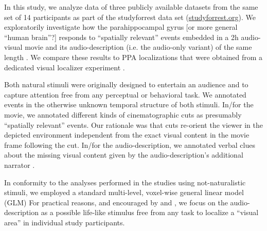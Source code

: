 \documentclass[english]{article}
\begin{document}

In this study, we analyze data of three publicly available datasets from the same set of 14 participants as part of the studyforrest data set (\href{http://www.studyforrest.org}{studyforrest.org}).
We exploratorily investigate how the parahippocampal gyrus [or more general ``human brain''?] responds to ``spatially relevant'' events embedded in a 2h audio-visual movie \citep{hanke2016simultaneous} and its audio-description (i.e. the audio-only variant) of the same length \citep{hanke2014audiomovie}.
We compare these results to PPA localizations that were obtained from a dedicated visual localizer experiment \citep{sengupta2016extension}.

Both natural stimuli were originally designed to entertain an audience and to capture attention free from any perceptual or behavioral task.
We annotated events in the otherwise unknown temporal structure of both stimuli.
In/for the movie, we annotated different kinds of cinematographic cuts \citep{haeusler2016cutanno} as presumably ``spatially relevant'' events.
Our rationale was that cuts re-orient the viewer in the depicted environment independent from the exact visual content in the movie frame following the cut.
In/for the audio-description, we annotated verbal clues about the missing visual content given by the audio-description's additional narrator \citep{haeusler2020speechanno}.

In conformity to the analyses performed in the studies using not-naturalistic stimuli, we employed a standard multi-level, voxel-wise general linear model (GLM) %
For practical reasons, and encouraged by \citep{aziz2008modulation} and \citep{aminoff2013role}, we focus on the audio-description as a possible life-like stimulus free from any task to localize a ``visual area'' in individual study participants.
\end{document}
